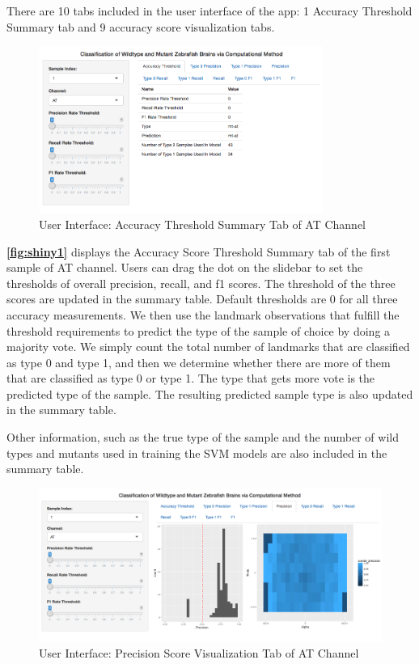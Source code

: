 \documentclass[10pt,letterpaper]{article}
\begin{document}
There are 10 tabs included in the user interface of the app: 1 Accuracy
Threshold Summary tab and 9 accuracy score visualization tabs.

\begin{figure}[h]

{\centering \includegraphics[width=3.66in]{figures/shiny1} 

}

\caption{\label{fig:shiny1} User Interface: Accuracy Threshold Summary Tab of AT Channel}\label{fig:unnamed-chunk-10}
\end{figure}

\textbf{\autoref{fig:shiny1}} displays the Accuracy Score Threshold
Summary tab of the first sample of AT channel. Users can drag the dot on
the slidebar to set the thresholds of overall precision, recall, and f1
scores. The threshold of the three scores are updated in the summary
table. Default thresholds are 0 for all three accuracy measurements. We
then use the landmark observations that fulfill the threshold
requirements to predict the type of the sample of choice by doing a
majority vote. We simply count the total number of landmarks that are
classified as type 0 and type 1, and then we determine whether there are
more of them that are classified as type 0 or type 1. The type that gets
more vote is the predicted type of the sample. The resulting predicted
sample type is also updated in the summary table.

Other information, such as the true type of the sample and the number of
wild types and mutants used in training the SVM models are also included
in the summary table.

\begin{figure}[h]

{\centering \includegraphics[width=4.92in]{figures/shiny2} 

}

\caption{\label{fig:shiny2} User Interface: Precision Score Visualization Tab of AT Channel}\label{fig:unnamed-chunk-11}
\end{figure}
\end{document}
